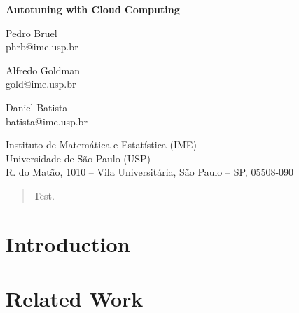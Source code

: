 \documentclass[a4paper, 12pt]{article}
\begin{document}
\hypersetup{backref,pdfpagemode=FullScreen,colorlinks=true}

\thispagestyle{empty}
\begin{center}
    \textbf{\Large{Autotuning with Cloud Computing}}\\

    \vspace*{1cm}

    \begin{minipage}{.3\linewidth}
        \begin{flushleft}
            Pedro Bruel\\
            phrb@ime.usp.br
        \end{flushleft}
    \end{minipage}
    \begin{minipage}{.3\linewidth}
        \begin{center}
            Alfredo Goldman\\
            gold@ime.usp.br
        \end{center}
    \end{minipage}
    \begin{minipage}{.3\linewidth}
        \begin{flushright}
            Daniel Batista\\
            batista@ime.usp.br
        \end{flushright}
    \end{minipage}

    \vskip 1cm

    \normalsize{Instituto de Matemática e Estatística (IME)\\
                Universidade de São Paulo (USP)\\
                R. do Matão, 1010 – Vila Universitária, São Paulo – SP, 05508-090\\}

\end{center}

\begin{abstract}
    Test.
\end{abstract}

\section{Introduction} \label{sec:intro}

\section{Related Work} \label{sec:related}
\end{document}
